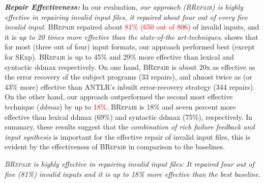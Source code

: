 \documentclass[sigconf,review,anonymous]{acmart}
\newenvironment{result}{\begin{framed}\centering\it}{\end{framed}}
\newcommand{\recheck}[1]{\textcolor{red}{#1}}
\newcommand{\approach}{\textsc{BRepair}\xspace}
\begin{document}
\noindent \textbf{\textit{Repair Effectiveness:}} In our evaluation, %
\textit{our approach (\approach) is highly effective in repairing invalid input files, it repaired about four out of every five invalid input}. \approach repaired about \recheck{81\% (650 out of 806)} of invalid inputs, and it is \textit{up to 20 times more effective than %
the state-of-the art-techniques}.
shows that for most (three out of four) input formats, our approach performed best (except for SExp).  \approach is up to 45\% and 29\% more effective than lexical and syntactic ddmax %
respectively.
On one hand, \approach is about 20x as effective as the error recovery of the subject programs (33 repairs), and almost twice as (or 43\% more) effective than ANTLR's inbuilt error-recovery strategy (344 repairs). On the other hand, our approach outperformed the second most effective technique (\textit{ddmax}) by up to \recheck{18\%}. \approach is 18\% and seven percent more effective than lexical ddmax (69\%) and syntactic ddmax (75\%), respectively.
In summary, these results suggest that %
the \textit{combination of rich failure feedback and input synthesis} is important for the effective repair of invalid input files, this is evident by the effectiveness of \approach in comparison to the baselines.

\begin{result}
\approach is highly effective in repairing invalid input files: %
It repaired four out of five (81\%) invalid inputs and it is up to 18\% more effective than the best baseline.
\end{result}
\end{document}
